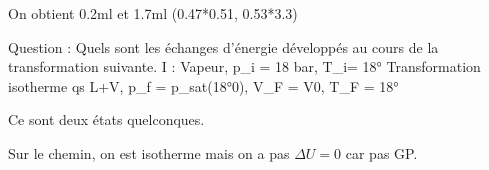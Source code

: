 \documentclass[french]{yLectureNote}
\begin{document}
On obtient 0.2ml et 1.7ml (0.47*0.51, 0.53*3.3)

Question : Quels sont les échanges d'énergie développés au cours de la transformation suivante. 
I : Vapeur, p_i = 18 bar, T_i= 18°
Transformation isotherme qs
L+V, p_f = p_{sat}(18°0), V_F = V0, T_F = 18°

Ce sont deux états quelconques.

Sur le chemin, on est isotherme mais on a pas $\Delta U=0$ car pas GP.
\end{document}
